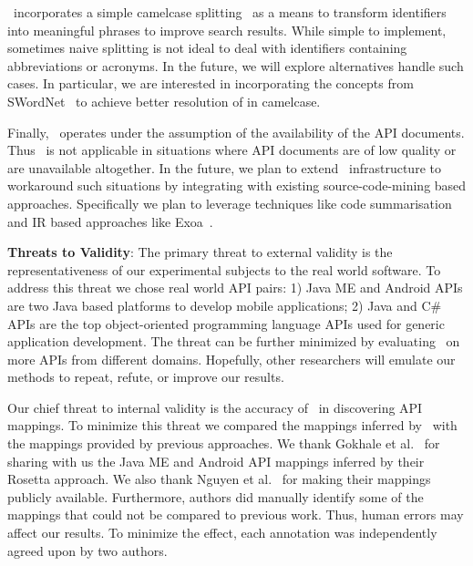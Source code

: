 \tool\ incorporates a simple camelcase splitting~\cite{Little2009} as a means to transform identifiers into meaningful phrases to improve search results. While simple to implement, sometimes naive splitting is not ideal to deal with identifiers containing abbreviations or acronyms. In the future, we will explore alternatives handle such cases. In particular, we are interested in incorporating the concepts from SWordNet~\cite{Yang2014} to achieve better resolution of in camelcase.

Finally, \tool\ operates under the assumption of the availability of the API documents.
Thus \tool\ is not applicable in situations where API documents are of low quality or are unavailable altogether.
In the future, we plan to extend \tool\ infrastructure to workaround such situations
by integrating with existing source-code-mining based approaches.
Specifically we plan to leverage techniques like code summarisation~\cite{sridhara2011ICPC} and IR based approaches like Exoa~\cite{kim2010towards}.



\textbf{Threats to Validity}: The primary threat to external validity is the representativeness of our experimental subjects to the real world software.
To address this threat we chose real world API pairs:
1) Java ME and Android APIs are two Java based platforms to develop mobile applications; 
2) Java and C\# APIs are the top object-oriented programming language APIs used for generic application development. 
The threat can be further minimized by evaluating \tool\ on more APIs from different domains.
Hopefully, other researchers will emulate our methods to repeat, refute, or improve our results. 

Our chief threat to internal validity is the accuracy of \tool\ in discovering API mappings. 
To minimize this threat we compared the mappings inferred by \tool\ with
the mappings provided by previous approaches. We thank Gokhale et al.~\cite{Gokhale2013ICSE} for sharing with us the Java ME and Android API mappings inferred by their Rosetta approach. We also thank Nguyen et al.~\cite{nguyen2014statistical} for making their mappings publicly available. Furthermore, authors did manually identify some of the mappings that could not be compared to previous work.
Thus, human errors may affect our results. 
To minimize the effect, each annotation was independently agreed upon by two authors.

